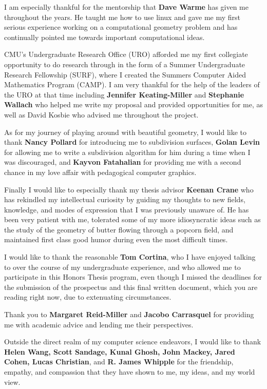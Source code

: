 \documentclass[12pt, letterpaper]{article}
\begin{document}
I am especially thankful for the mentorship that \textbf{Dave Warme} has given me throughout the years.
He taught me how to use linux and gave me my first serious experience working on a computational geometry problem and has continually pointed me 
towards important computational ideas.

CMU's Undergraduate Research Office (URO) afforded me my first collegiate opportunity to do research through in the form of a
Summer Undergraduate Research Fellowship (SURF), where I created the Summers Computer Aided Mathematics Program (CAMP).
I am very thankful for the help of the leaders of the URO at that time including \textbf{Jennifer Keating-Miller} and \textbf{Stephanie Wallach}
who helped me write my proposal and provided opportunities for me, as well as David Kosbie who advised me throughout the project.

As for my journey of playing around with beautiful geometry, I would like to thank \textbf{Nancy Pollard} for introducing me to subdivision surfaces,
\textbf{Golan Levin} for allowing me to write a subdivision algorithm for him during a time when I was discouraged,
and \textbf{Kayvon Fatahalian} for providing me with a second chance in my love affair with pedagogical computer graphics.

Finally I would like to especially thank my thesis advisor \textbf{Keenan Crane} who has
rekindled my intellectual curiosity by guiding my thoughts to new fields, knowledge, and modes of expression that I was previously unaware of.
He has been very patient with me, tolerated some of my more idiosyncratic ideas such as the study of the geometry of butter flowing through a popcorn field,
and maintained first class good humor during even the most difficult times.

I would like to thank the reasonable \textbf{Tom Cortina}, who I have enjoyed talking to over the course of my undergraduate experience, and who allowed me to 
participate in this Honors Thesis program, even though I missed the deadlines for the submission of the prospectus and this final
written document, which you are reading right now, due to extenuating circumstances.

Thank you to \textbf{Margaret Reid-Miller} and \textbf{Jacobo Carrasquel} for providing me with academic advice and lending me their perspectives.

Outside the direct realm of my computer science endeavors, I would like to thank \textbf{Helen Wang,
	Scott Sandage, Kunal Ghosh, John Mackey, Jared Cohen, Lucas Christian},
and \textbf{R. James Whipple} for the friendship, empathy, and compassion that they have shown to me, my ideas, and my world view.
\end{document}
